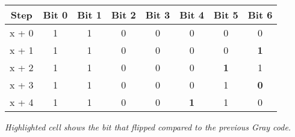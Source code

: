 \begin{tabular}{|c|*7{c|}}
\hline
Step &  Bit 0 &  Bit 1 &  Bit 2 &  Bit 3 &  Bit 4 &  Bit 5 &  Bit 6   \\
\hline
x + 0 &
    1
&    1
&    0
&    0
&    0
&    0
&    0
 \\
\hline
x + 1 &
    1
&    1
&    0
&    0
&    0
&    0
&    \cellcolor{yellow}\textbf{ 1 }
 \\
\hline
x + 2 &
    1
&    1
&    0
&    0
&    0
&    \cellcolor{yellow}\textbf{ 1 }
&    1
 \\
\hline
x + 3 &
    1
&    1
&    0
&    0
&    0
&    1
&    \cellcolor{yellow}\textbf{ 0 }
 \\
\hline
x + 4 &
    1
&    1
&    0
&    0
&    \cellcolor{yellow}\textbf{ 1 }
&    1
&    0
 \\
\hline
\end{tabular}

\emph{Highlighted cell shows the bit that flipped compared to the previous Gray code.}



\pagebreak